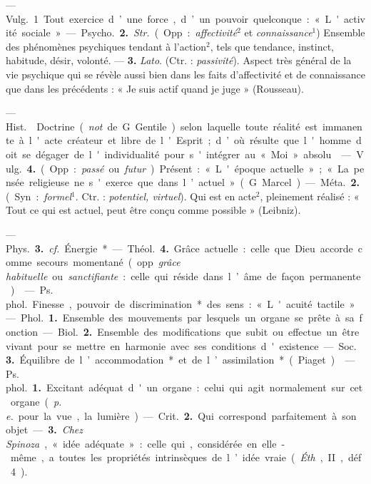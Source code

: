 \begin{itemize}[leftmargin=1cm, label=, itemsep=1pt]
 — \si{Vulg.} 1 Tout exercice
d’une force, d’un pouvoir quelconque : « L'activité sociale ».

— \si{Psycho.} {\bf 2.} {\it Str.} (Opp. : {\it affectivité}$^2$ et {\it connaissance}$^1$) Ensemble
des phénomènes psychiques tendant
à l’action$^2$, tels que tendance, instinct, habitude, désir, volonté. —
 {\bf 3.} {\it Lato}. (Ctr. : {\it passivité}). Aspect
très général de la vie psychique qui
se révèle aussi bien dans les faits
d’affectivité et de connaissance que
dans les précédents : « Je suis actif
quand je juge » (Rousseau).

 — \si{Hist.}  Doctrine ({\it not}.
de G. Gentile) selon laquelle toute
réalité est immanente à l'acte créateur et libre de l'Esprit; d’où résulte
que l'homme doit se dégager de
l'individualité pour s'intégrer au
« Moi » absolu.

 — \si{Vulg.} {\bf 4.} (Opp. : {\it passé} ou
{\it futur}). Présent : « L'époque actuelle » ;
« La pensée religieuse ne s'exerce que
dans l’actuel » (G. Marcel).

— \si{Méta.} {\bf 2.} (Syn. : {\it formel}$^1$. Ctr. :
{\it potentiel, virtuel}). Qui est en acte$^2$,
pleinement réalisé : « Tout ce qui est
actuel, peut être conçu comme possible » (Leibniz).

— \si{Phys.} {\bf 3.} {\it cf.}  Énergie*.

— \si{Théol.} {\bf 4.} Grâce actuelle : celle
que Dieu accorde comme secours
momentané (opp. {\it grâce habituelle} ou
{\it sanctifiante} : celle qui réside dans
l’âme de façon permanente).

 — \si{Ps. phol.} Finesse,
pouvoir de discrimination* des sens :
« L'acuité tactile ».

 — \si{Phol.} {\bf 1.} Ensemble des
mouvements par lesquels un organe
se prête à sa fonction.

— \si{Biol.} {\bf 2.} Ensemble des modifications que subit ou effectue un être
vivant pour se mettre en harmonie
avec ses conditions d'existence.

— \si{Soc.} {\bf 3.} Équilibre de l’accommodation* et de l’assimilation* (Piaget).

 — \si{Ps. phol.} {\bf 1.} Excitant adéquat d'un organe : celui qui agit
normalement sur cet organe ({\it p. e.}
pour la vue, la lumière).

— \si{Crit.} {\bf 2.} Qui correspond parfaitement à son objet. — {\bf 3.} {\it Chez
Spinoza}, « idée adéquate » : celle qui,
considérée en elle-même, a toutes
les propriétés intrinsèques de l’idée
vraie ({\it Éth}., II, déf. 4).


\end{itemize}
